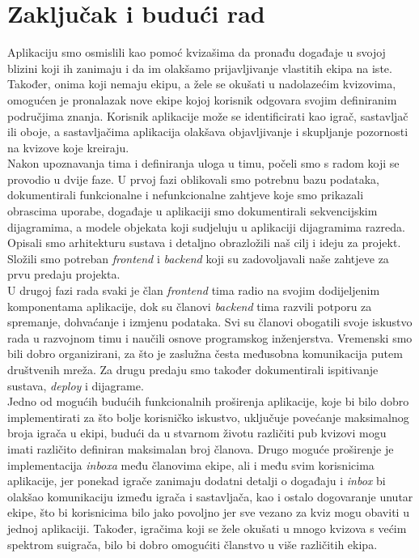 \chapter{Zaključak i budući rad}
		
		

		
		Aplikaciju smo osmislili kao pomoć kvizašima da pronađu događaje u svojoj blizini koji ih zanimaju i da im olakšamo prijavljivanje vlastitih ekipa na iste.
Također, onima koji nemaju ekipu, a žele se okušati u nadolazećim kvizovima, omogućen je pronalazak nove ekipe kojoj korisnik odgovara svojim definiranim područjima znanja. Korisnik aplikacije može se identificirati kao igrač, sastavljač ili oboje, a sastavljačima aplikacija olakšava objavljivanje i skupljanje pozornosti na kvizove koje kreiraju. \\
Nakon upoznavanja tima i definiranja uloga u timu, počeli smo s radom koji se provodio u dvije faze. U prvoj fazi oblikovali smo potrebnu bazu podataka, dokumentirali funkcionalne i nefunkcionalne zahtjeve koje smo prikazali obrascima uporabe, događaje u aplikaciji smo dokumentirali sekvencijskim dijagramima, a modele objekata koji sudjeluju u aplikaciji dijagramima razreda. Opisali smo arhitekturu sustava i detaljno obrazložili naš cilj i ideju za projekt. Složili smo potreban \textit{frontend} i \textit{backend} koji su zadovoljavali naše zahtjeve za prvu predaju projekta. \\
U drugoj fazi rada svaki je član \textit{frontend} tima radio na svojim dodijeljenim komponentama aplikacije, dok su članovi \textit{backend} tima razvili potporu za spremanje, dohvaćanje i izmjenu podataka. Svi su članovi obogatili svoje iskustvo rada u razvojnom timu i naučili osnove programskog inženjerstva. Vremenski smo bili dobro organizirani, za što je zaslužna česta međusobna komunikacija putem društvenih mreža. Za drugu predaju smo također dokumentirali ispitivanje sustava, \textit{deploy} i dijagrame.\\
Jedno od mogućih budućih funkcionalnih proširenja aplikacije, koje bi bilo dobro implementirati za što bolje korisničko iskustvo, uključuje povećanje maksimalnog broja igrača u ekipi, budući da u stvarnom životu različiti pub kvizovi mogu imati različito definiran maksimalan broj članova. Drugo moguće proširenje je implementacija\textit{ inboxa} među članovima ekipe, ali i među svim korisnicima aplikacije, jer ponekad igrače zanimaju dodatni detalji o događaju i\textit{ inbox} bi olakšao komunikaciju između igrača i sastavljača, kao i ostalo dogovaranje unutar ekipe, što bi korisnicima bilo jako povoljno jer sve vezano za kviz mogu obaviti u jednoj aplikaciji. Također, igračima koji se žele okušati u mnogo kvizova s većim spektrom suigrača, bilo bi dobro omogućiti članstvo u više različitih ekipa.\\


		
		\eject 